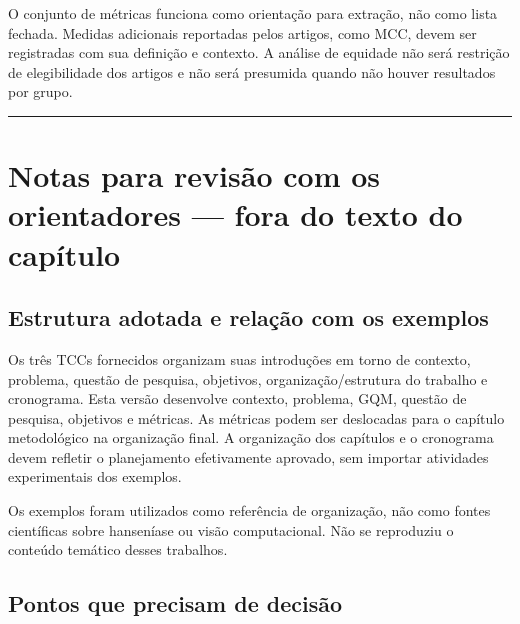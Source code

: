 \documentclass[
]{article}
\begin{document}
O conjunto de métricas funciona como orientação para extração, não como
lista fechada. Medidas adicionais reportadas pelos artigos, como MCC,
devem ser registradas com sua definição e contexto. A análise de
equidade não será restrição de elegibilidade dos artigos e não será
presumida quando não houver resultados por grupo.

\begin{center}\rule{0.5\linewidth}{0.5pt}\end{center}

\section{Notas para revisão com os orientadores --- fora do texto do
capítulo}\label{notas-para-revisuxe3o-com-os-orientadores-fora-do-texto-do-capuxedtulo}

\subsection{Estrutura adotada e relação com os
exemplos}\label{estrutura-adotada-e-relauxe7uxe3o-com-os-exemplos}

Os três TCCs fornecidos organizam suas introduções em torno de contexto,
problema, questão de pesquisa, objetivos, organização/estrutura do
trabalho e cronograma. Esta versão desenvolve contexto, problema, GQM,
questão de pesquisa, objetivos e métricas. As métricas podem ser
deslocadas para o capítulo metodológico na organização final. A
organização dos capítulos e o cronograma devem refletir o planejamento
efetivamente aprovado, sem importar atividades experimentais dos
exemplos.

Os exemplos foram utilizados como referência de organização, não como
fontes científicas sobre hanseníase ou visão computacional. Não se
reproduziu o conteúdo temático desses trabalhos.

\subsection{Pontos que precisam de
decisão}\label{pontos-que-precisam-de-decisuxe3o}
\end{document}
